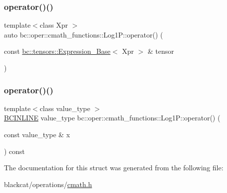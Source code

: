 \mbox{\label{structbc_1_1oper_1_1cmath__functions_1_1Log1P_a62c752e35e066b731f89babc6f456c6f}} 
\subsubsection{\texorpdfstring{operator()()}{operator()()}\hspace{0.1cm}{\footnotesize\ttfamily [2/3]}}
{\footnotesize\ttfamily template$<$class Xpr $>$ \\
auto bc\+::oper\+::cmath\+\_\+functions\+::\+Log1\+P\+::operator() (\begin{DoxyParamCaption}\item[{const \hyperlink{classbc_1_1tensors_1_1Expression__Base}{bc\+::tensors\+::\+Expression\+\_\+\+Base}$<$ Xpr $>$ \&}]{tensor }\end{DoxyParamCaption})\hspace{0.3cm}{\ttfamily [inline]}}

\mbox{\label{structbc_1_1oper_1_1cmath__functions_1_1Log1P_a913edb05459b7644dc8354ef92579c6f}} 
\subsubsection{\texorpdfstring{operator()()}{operator()()}\hspace{0.1cm}{\footnotesize\ttfamily [3/3]}}
{\footnotesize\ttfamily template$<$class value\+\_\+type $>$ \\
\hyperlink{common_8h_a6699e8b0449da5c0fafb878e59c1d4b1}{B\+C\+I\+N\+L\+I\+NE} value\+\_\+type bc\+::oper\+::cmath\+\_\+functions\+::\+Log1\+P\+::operator() (\begin{DoxyParamCaption}\item[{const value\+\_\+type \&}]{x }\end{DoxyParamCaption}) const\hspace{0.3cm}{\ttfamily [inline]}}



The documentation for this struct was generated from the following file\+:\begin{DoxyCompactItemize}
\item 
blackcat/operations/\hyperlink{cmath_8h}{cmath.\+h}\end{DoxyCompactItemize}
